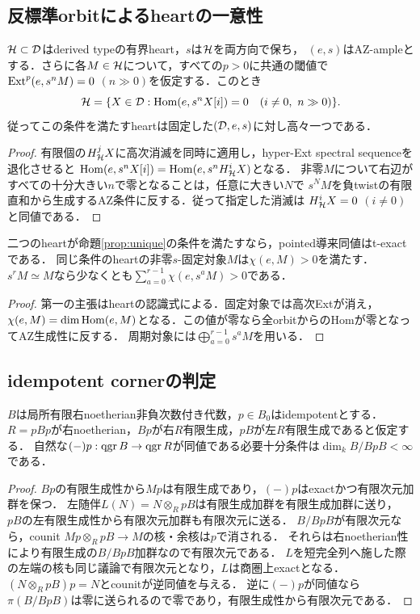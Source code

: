 \subsection{反標準orbitによるheartの一意性}
\begin{proposition}\label{prop:unique}
$\mathcal H\subset\mathcal D$はderived typeの有界heart，$s$は$\mathcal H$を両方向で保ち，
$(e,s)$はAZ-ampleとする．さらに各$M\in\mathcal H$について，すべての$p>0$に共通の閾値で
$\operatorname{Ext}^p(e,s^nM)=0$ $(n\gg0)$を仮定する．このとき
\[
\cH=\{X\in\cD:\Hom(e,s^nX[i])=0\quad(i\ne0,\ n\gg0)\}.
\]
従ってこの条件を満たすheartは固定した$(\mathcal D,e,s)$に対し高々一つである．
\end{proposition}
\begin{proof}
有限個の$H^j_{\mathcal H}X$に高次消滅を同時に適用し，hyper-Ext spectral sequenceを退化させると
$\operatorname{Hom}(e,s^nX[i])=\operatorname{Hom}(e,s^nH^i_{\mathcal H}X)$となる．
非零$M$について右辺がすべての十分大きい$n$で零となることは，任意に大きい$N$で
$s^NM$を負twistの有限直和から生成するAZ条件に反する．従って指定した消滅は
$H^i_{\mathcal H}X=0$ $(i\ne0)$と同値である．
\end{proof}
\begin{corollary}\label{cor:ampleexact}
二つのheartが命題\ref{prop:unique}の条件を満たすなら，pointed導来同値はt-exactである．
同じ条件のheartの非零$s$-固定対象$M$は$\chi(e,M)>0$を満たす．
$s^rM\simeq M$なら少なくとも$\sum_{a=0}^{r-1}\chi(e,s^aM)>0$である．
\end{corollary}
\begin{proof}
第一の主張はheartの認識式による．固定対象では高次Extが消え，
$\chi(e,M)=\dim\operatorname{Hom}(e,M)$となる．この値が零なら全orbitからのHomが零となってAZ生成性に反する．
周期対象には$\bigoplus_{a=0}^{r-1}s^aM$を用いる．
\end{proof}

\subsection{idempotent cornerの判定}
\begin{proposition}\label{prop:corner}
$B$は局所有限右noetherian非負次数付き代数，$p\in B_0$はidempotentとする．
$R=pBp$が右noetherian，$Bp$が右$R$有限生成，$pB$が左$R$有限生成であると仮定する．
自然な$(-)p:\operatorname{qgr} B\to\operatorname{qgr} R$が同値である必要十分条件は$\dim_k B/BpB<\infty$である．
\end{proposition}
\begin{proof}
$Bp$の有限生成性から$Mp$は有限生成であり，$(-)p$はexactかつ有限次元加群を保つ．
左随伴$L(N)=N\otimes_RpB$は有限生成加群を有限生成加群に送り，
$pB$の左有限生成性から有限次元加群も有限次元に送る．
$B/BpB$が有限次元なら，counit $Mp\otimes_RpB\to M$の核・余核は$p$で消される．
それらは右noetherian性により有限生成の$B/BpB$加群なので有限次元である．
$L$を短完全列へ施した際の左端の核も同じ議論で有限次元となり，$L$は商圏上exactとなる．
$(N\otimes_RpB)p=N$とcounitが逆同値を与える．
逆に$(-)p$が同値なら$\pi(B/BpB)$は零に送られるので零であり，有限生成性から有限次元である．
\end{proof}


